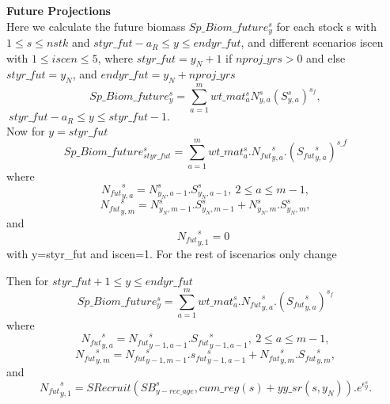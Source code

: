 \documentclass{article}
\begin{document}
\textbf{Future Projections}\\
Here we calculate the future biomass $Sp\_Biom\_future^s_{y}$ for each stock s with $1 \leq s \leq nstk$ and $styr\_fut-a_R\leq y \leq endyr\_fut$, and different scenarios iscen with $1\leq iscen \leq 5$, where $styr\_fut=y_N+1$ if $nproj\_yrs>0$ and else $styr\_fut=y_N$, and $endyr\_fut=y_N+nproj\_yrs$
\begin{equation}
    Sp\_Biom\_future^s_y=\sum_{a=1}^mwt\_{mat}^s_a N^s_{y,a}(S^s_{y,a})^{s_f}, 
\end{equation}
$\ styr\_fut-a_R\leq y \leq styr\_fut-1.$\\

Now for $y=styr\_fut$
\begin{equation}
    Sp\_Biom\_future^s_{styr\_fut}= \sum_{a=1}^mwt\_{mat}^s_a.{N_{fut}}^s_{y,a}.({{S_{fut}}^s_{y,a}})^{s\_f}
\end{equation}
where 
\begin{equation}
    {N_{fut}}^s_{y,a}=N^s_{y_N,a-1}.S^s_{y_N,a-1}, \ 2\leq a \leq m-1,
\end{equation}
\begin{equation}
    {N_{fut}}^s_{y,m}=N^s_{y_N,m-1}.S^s_{y_N,m-1}+N^s_{y_N,m}.S^s_{y_N,m},
\end{equation}
and 
\begin{equation}
    {N_{fut}}^s_{y,1}=0 \ \ 
\end{equation}
with y=styr\_fut and iscen=1. For the rest of iscenarios only change 
\begin{equation}
    
\end{equation}


Then for $styr\_fut+1 \leq y \leq endyr\_fut$
\begin{equation}
    Sp\_Biom\_future^s_y = \sum_{a=1}^m wt\_mat^s_{a}.{N_{fut}}^s_{y,a}.({S_{fut}}^s_{y,a})^{s_f}
\end{equation}
where
\begin{equation}
   {N_{fut}}^s_{y,a}={N_{fut}}^s_{y-1,a-1}.{S_{fut}}^s_{y-1,a-1},  \ 2\leq a \leq m-1,
\end{equation}
\begin{equation}
    {N_{fut}}^s_{y,m}={N_{fut}}^s_{y-1,m-1}.{s_{fut}}^s_{y-1,a-1} + {N_{fut}}^s_{y,m}.{S_{fut}}^s_{y,m},
\end{equation}
and
\begin{equation}
    {N_{fut}}^s_{y,1}=SRecruit(SB^s_{y-rec\_age},cum\_reg(s)+yy\_sr(s,y_N)).e^{\epsilon^s_{y}}.
\end{equation}
\end{document}
